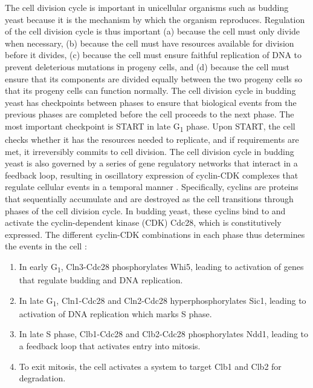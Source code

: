 The cell division cycle is important in unicellular organisms such as budding yeast because it is the mechanism by which the organism reproduces.
Regulation of the cell division cycle is thus important
(a) because the cell must only divide when necessary,
(b) because the cell must have resources available for division before it divides,
(c) because the cell must ensure faithful replication of DNA to prevent deleterious mutations in progeny cells,
and (d) because the cell must ensure that its components are divided equally between the two progeny cells so that its progeny cells can function normally.
The cell division cycle in budding yeast has checkpoints between phases to ensure that biological events from the previous phases are completed before the cell proceeds to the next phase.
The most important checkpoint is START in late G\textsubscript{1} phase.
Upon START, the cell checks whether it has the resources needed to replicate, and if requirements are met, it irreversibly commits to cell division.
The cell division cycle in budding yeast is also governed by a series of gene regulatory networks that interact in a feedback loop, resulting in oscillatory expression of cyclin-CDK complexes that regulate cellular events in a temporal manner \parencite{adlerYeastCellCycle2022, orlandoGlobalControlCellcycle2008, murrayRecyclingCellCycle2004}.
Specifically, cyclins are proteins that sequentially accumulate and are destroyed as the cell transitions through phases of the cell division cycle.
In budding yeast, these cyclins bind to and activate the cyclin-dependent kinase (CDK) Cdc28, which is constitutively expressed.
The different cyclin-CDK combinations in each phase thus determines the events in the cell \parencite{adlerYeastCellCycle2022}:

\begin{enumerate}
  \item In early G\textsubscript{1}, Cln3-Cdc28 phosphorylates Whi5, leading to activation of genes that regulate budding and DNA replication.
  \item In late G\textsubscript{1}, Cln1-Cdc28 and Cln2-Cdc28 hyperphosphorylates Sic1, leading to activation of DNA replication which marks S phase.
  \item In late S phase, Clb1-Cdc28 and Clb2-Cdc28 phosphorylates Ndd1, leading to a feedback loop that activates entry into mitosis.
  \item To exit mitosis, the cell activates a system to target Clb1 and Clb2 for degradation.
\end{enumerate}

